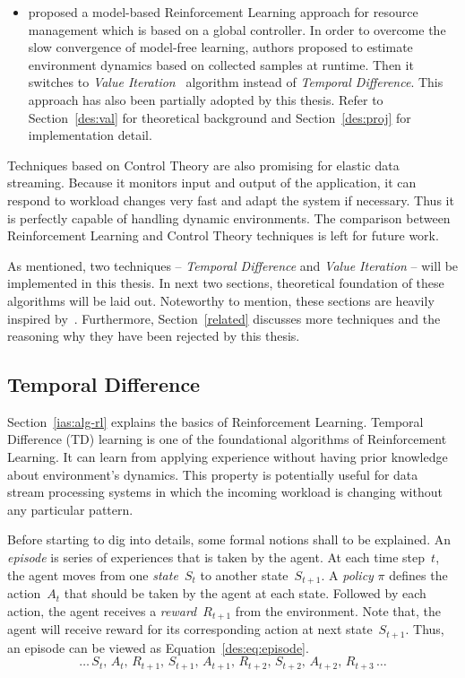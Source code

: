\begin{description}[leftmargin=0pt]
\begin{itemize}
        \item \textcite{dutreilh:hal-01122123} proposed a model-based Reinforcement Learning approach for resource management which is based on a global controller. In order to overcome the slow convergence of model-free learning, authors proposed to estimate environment dynamics based on collected samples at runtime. Then it switches to \emph{Value Iteration}~\cite{rlIntro} algorithm instead of \emph{Temporal Difference}. This approach has also been partially adopted by this thesis. Refer to Section~\ref{des:val} for theoretical background and Section~\ref{des:proj} for implementation detail.
    \end{itemize}
    \item[Control Theory] Techniques based on Control Theory are also promising for elastic data streaming. Because it monitors input and output of the application, it can respond to workload changes very fast and adapt the system if necessary. Thus it is perfectly capable of handling dynamic environments. The comparison between Reinforcement Learning and Control Theory techniques is left for future work.
\end{description}
As mentioned, two techniques -- \emph{Temporal Difference} and \emph{Value Iteration} -- will be implemented in this thesis. In next two sections, theoretical foundation of these algorithms will be laid out. Noteworthy to mention, these sections are heavily inspired by~\textcite{rlIntro}. Furthermore, Section~\ref{related} discusses more techniques and the reasoning why they have been rejected by this thesis.
\clearpage
\subsection{Temporal Difference}
\label{des:temp}
Section~\ref{ias:alg-rl} explains the basics of Reinforcement Learning. Temporal Difference (TD) learning is one of the foundational algorithms of Reinforcement Learning. It can learn from applying experience without having prior knowledge about environment's dynamics. This property is potentially useful for data stream processing systems in which the incoming workload is changing without any particular pattern.

Before starting to dig into details, some formal notions shall to be explained. An \emph{episode} is series of experiences that is taken by the agent. At each time step~$t$, the agent moves from one \emph{state}~$S_t$ to another state~$S_{t+1}$. A \emph{policy} $\pi$ defines the action~$A_t$ that should be taken by the agent at each state. Followed by each action, the agent receives a \emph{reward}~$R_{t+1}$ from the environment. Note that, the agent will receive reward for its corresponding action at next state~$S_{t+1}$. Thus, an episode can be viewed as Equation~\ref{des:eq:episode}.
\begin{equation}
\dots\,S_t,\,A_t,\,R_{t+1},\,S_{t+1},\,A_{t+1},\,R_{t+2},\,S_{t+2},\,A_{t+2},\,R_{t+3}\,\dots
\label{des:eq:episode}
\end{equation}

